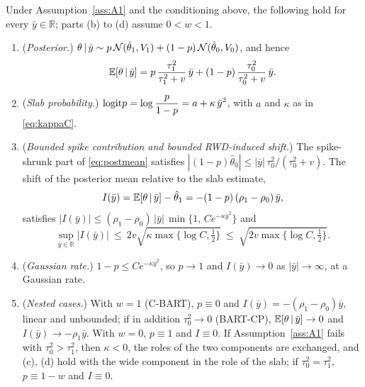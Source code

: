 \begin{thmA}\label{thm:T1}
Under Assumption~\ref{ass:A1} and the conditioning above, the following hold for every $\bar y\in\mathbb R$; parts (b) to (d) assume $0<w<1$.
\begin{enumerate}[label=(\alph*),leftmargin=2.2em]
\item (\emph{Posterior.}) $\theta\,\vert\,\bar y\sim p\,\mathcal{N}(\hat\theta_1,V_1)+(1-p)\,\mathcal{N}(\hat\theta_0,V_0)$, and hence
\begin{equation}
\mathbb{E}[\theta\,\vert\,\bar y]=p\,\frac{\tau_1^2}{\tau_1^2+v}\,\bar y+(1-p)\,\frac{\tau_0^2}{\tau_0^2+v}\,\bar y .
\label{eq:postmean}
\end{equation}
\item (\emph{Slab probability.}) $\displaystyle \mathrm{logit} p=\log\frac{p}{1-p}=a+\kappa\,\bar y^2$, with $a$ and $\kappa$ as in \eqref{eq:kappaC}.
\item (\emph{Bounded spike contribution and bounded RWD-induced shift.}) The spike-shrunk part of \eqref{eq:postmean} satisfies $|(1-p)\hat\theta_0|\le|\bar y|\,\tau_0^2/(\tau_0^2+v)$. The shift of the posterior mean relative to the slab estimate,
\begin{equation}
I(\bar y)=\mathbb{E}[\theta\,\vert\,\bar y]-\hat\theta_1=-(1-p)\,(\rho_1-\rho_0)\,\bar y ,
\label{eq:I}
\end{equation}
satisfies $|I(\bar y)|\le(\rho_1-\rho_0)\,|\bar y|\,\min\{1,\,Ce^{-\kappa\bar y^2}\}$ and
\begin{equation}
\sup_{\bar y\in\mathbb R}|I(\bar y)|\ \le\ 2v\sqrt{\kappa\max\{\log C,\tfrac12\}}\ \le\ \sqrt{2v\max\{\log C,\tfrac12\}} .
\label{eq:supI}
\end{equation}
\item (\emph{Gaussian rate.}) $1-p\le Ce^{-\kappa\bar y^2}$, so $p\to1$ and $I(\bar y)\to0$ as $|\bar y|\to\infty$, at a Gaussian rate.
\item (\emph{Nested cases.}) With $w=1$ (C-BART), $p\equiv0$ and $I(\bar y)=-(\rho_1-\rho_0)\bar y$, linear and unbounded; if in addition $\tau_0^2\to0$ (BART-CP), $\mathbb{E}[\theta\,\vert\,\bar y]\to0$ and $I(\bar y)\to-\rho_1\bar y$. With $w=0$, $p\equiv1$ and $I\equiv0$. If Assumption~\ref{ass:A1} fails with $\tau_0^2>\tau_1^2$, then $\kappa<0$, the roles of the two components are exchanged, and (c), (d) hold with the wide component in the role of the slab; if $\tau_0^2=\tau_1^2$, $p\equiv1-w$ and $I\equiv0$.
\end{enumerate}
\end{thmA}

